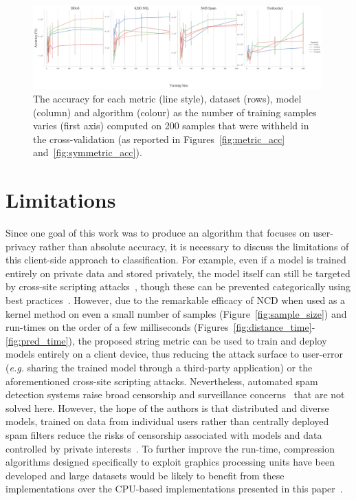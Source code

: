 \documentclass[preprint,12pt]{article}
\begin{document}
\begin{figure}[h]
    \centering
    \includegraphics[width=0.99\textwidth]{images/accuracy_vs_sample_size_vs_symmetric.pdf}
    \caption{The accuracy for each metric (line style), dataset (rows), model (column) and algorithm (colour) as the number of training samples varies (first axis) computed on 200 samples that were withheld in the cross-validation (as reported in Figures~\ref{fig:metric_acc} and~\ref{fig:symmetric_acc}).}
    \label{fig:sample_size_symmetric}
\end{figure}





\section{Limitations}
\label{limitations}

Since one goal of this work was to produce an algorithm that focuses on user-privacy rather than absolute accuracy, it is necessary to discuss the limitations of this client-side approach to classification.
For example, even if a model is trained entirely on private data and stored privately, the model itself can still be targeted by cross-site scripting attacks~\cite{}, though these can be prevented categorically using best practices~\cite{}. 
However, due to the remarkable efficacy of NCD when used as a kernel method on even a small number of samples (Figure~\ref{fig:sample_size}) and run-times on the order of a few milliseconds (Figures~\ref{fig:distance_time}-\ref{fig:pred_time}), the proposed string metric can be used to train and deploy models entirely on a client device, thus reducing the attack surface to user-error (\textit{e.g.} sharing the trained model through a third-party application) or the aforementioned cross-site scripting attacks. 
Nevertheless, automated spam detection systems raise broad censorship and surveillance concerns~\cite{chat_control} that are not solved here. 
However, the hope of the authors is that distributed and diverse models, trained on data from individual users rather than centrally deployed spam filters reduce the risks of censorship associated with models and data controlled by private interests~\cite{chat_control}. 
To further improve the run-time, compression algorithms designed specifically to exploit graphics processing units have been developed and large datasets would be likely to benefit from these implementations over the CPU-based implementations presented in this paper~\cite{compression_gpu}. 
\end{document}
